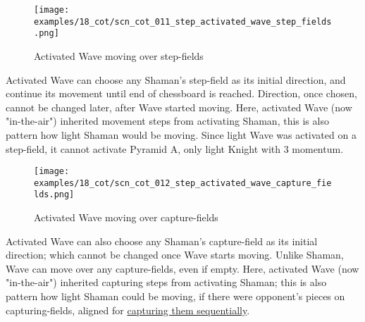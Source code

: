 \clearpage %

\vspace*{-2.3\baselineskip}
\noindent
\begin{figure}[!h]
\texttt{[image: examples/18\_cot/scn\_cot\_011\_step\_activated\_wave\_step\_fields.png]}
\vspace*{-1.4\baselineskip}
\caption{Activated Wave moving over step-fields}
\label{fig:scn_cot_011_step_activated_wave_step_fields}
\end{figure}

\vspace*{-0.5\baselineskip}
Activated Wave can choose any Shaman's step-field as its initial direction, and
continue its movement until end of chessboard is reached. Direction, once chosen,
cannot be changed later, after Wave started moving.\newline
\indent
Here, activated Wave (now "in-the-air") inherited movement steps from activating
Shaman, this is also pattern how light Shaman would be moving. Since light Wave
was activated on a step-field, it cannot activate Pyramid A, only light Knight
with 3 momentum.

\clearpage %

\vspace*{-2.3\baselineskip}
\noindent
\begin{figure}[!h]
\texttt{[image: examples/18\_cot/scn\_cot\_012\_step\_activated\_wave\_capture\_fields.png]}
\vspace*{-1.4\baselineskip}
\caption{Activated Wave moving over capture-fields}
\label{fig:scn_cot_012_step_activated_wave_capture_fields}
\end{figure}

\vspace*{-0.5\baselineskip}
Activated Wave can also choose any Shaman's capture-field as its initial direction;
which cannot be changed once Wave starts moving. Unlike Shaman, Wave can move over
any capture-fields, even if empty.\newline
\indent
Here, activated Wave (now "in-the-air") inherited capturing steps from activating
Shaman; this is also pattern how light Shaman could be moving, if there were
opponent's pieces on capturing-fields, aligned for
\hyperref[fig:scn_cot_004_light_shaman_capture_ply]{capturing them sequentially}.

\clearpage %

